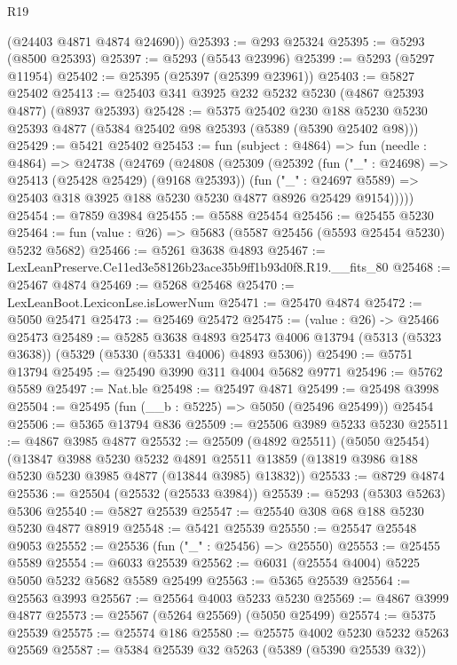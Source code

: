\begin{lexlean}{R19}
\begin{coremodule}
      (@24403 @4871 @4874 @24690))
@25393 := @293 @25324
@25395 := @5293 (@8500 @25393)
@25397 := @5293 (@5543 @23996)
@25399 := @5293 (@5297 @11954)
@25402 := @25395 (@25397 (@25399 @23961))
@25403 := @5827 @25402
@25413 := @25403 @341 @3925 @232 @5232 @5230 (@4867 @25393 @4877) (@8937 @25393)
@25428 := @5375
    @25402
    @230
    @188
    @5230
    @5230
    @25393
    @4877
    (@5384 @25402 @98 @25393 (@5389 (@5390 @25402 @98)))
@25429 := @5421 @25402
@25453 := fun (subject : @4864) =>
  fun (needle : @4864) =>
  @24738
    (@24769
      (@24808
        (@25309
          (@25392
            (fun ("_" : @24698) => @25413 (@25428 @25429) (@9168 @25393))
            (fun ("_" : @24697 @5589) =>
            @25403 @318 @3925 @188 @5230 @5230 @4877 @8926 @25429 @9154)))))
@25454 := @7859 @3984
@25455 := @5588 @25454
@25456 := @25455 @5230
@25464 := fun (value : @26) => @5683 (@5587 @25456 (@5593 @25454 @5230) @5232 @5682)
@25466 := @5261 @3638 @4893
@25467 := LexLeanPreserve.Ce11ed3e58126b23ace35b9ff1b93d0f8.R19.__fits_80
@25468 := @25467 @4874
@25469 := @5268 @25468
@25470 := LexLeanBoot.LexiconLse.isLowerNum
@25471 := @25470 @4874
@25472 := @5050 @25471
@25473 := @25469 @25472
@25475 := (value : @26) -> @25466 @25473
@25489 := @5285
    @3638
    @4893
    @25473
    @4006
    @13794
    (@5313 (@5323 @3638))
    (@5329 (@5330 (@5331 @4006) @4893 @5306))
@25490 := @5751 @13794
@25495 := @25490 @3990 @311 @4004 @5682 @9771
@25496 := @5762 @5589
@25497 := Nat.ble
@25498 := @25497 @4871
@25499 := @25498 @3998
@25504 := @25495 (fun (__b : @5225) => @5050 (@25496 @25499)) @25454
@25506 := @5365 @13794 @836
@25509 := @25506 @3989 @5233 @5230
@25511 := @4867 @3985 @4877
@25532 := @25509
    (@4892 @25511)
    (@5050 @25454)
    (@13847
      @3988
      @5230
      @5232
      @4891
      @25511
      @13859
      (@13819 @3986 @188 @5230 @5230 @3985 @4877 (@13844 @3985) @13832))
@25533 := @8729 @4874
@25536 := @25504 (@25532 (@25533 @3984))
@25539 := @5293 (@5303 @5263) @5306
@25540 := @5827 @25539
@25547 := @25540 @308 @68 @188 @5230 @5230 @4877 @8919
@25548 := @5421 @25539
@25550 := @25547 @25548 @9053
@25552 := @25536 (fun ("_" : @25456) => @25550)
@25553 := @25455 @5589
@25554 := @6033 @25539
@25562 := @6031 (@25554 @4004) @5225 @5050 @5232 @5682 @5589 @25499
@25563 := @5365 @25539
@25564 := @25563 @3993
@25567 := @25564 @4003 @5233 @5230
@25569 := @4867 @3999 @4877
@25573 := @25567 (@5264 @25569) (@5050 @25499)
@25574 := @5375 @25539
@25575 := @25574 @186
@25580 := @25575 @4002 @5230 @5232 @5263 @25569
@25587 := @5384 @25539 @32 @5263 (@5389 (@5390 @25539 @32))

\end{coremodule}
\end{lexlean}
